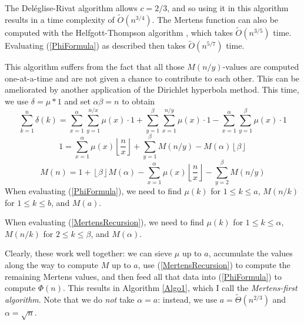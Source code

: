 \documentclass[12pt]{article}
\newcommand{\eqn}[1]{\begin{displaymath} #1 \end{displaymath}}
\newcommand{\neqn}[1]{\begin{equation} #1 \end{equation}}
\newcommand{\floor}[1]{{\left\lfloor #1 \right\rfloor}}
\newcommand{\floordiv}[2]{\floor{\frac{#1}{#2}}}
\newcommand{\softO}[0]{\widetilde{O}}
\newcommand{\softTheta}[0]{\widetilde{\Theta}}
\begin{document}
The Del\'{e}glise-Rivat algorithm \cite{DR1996} allows $c=2/3$, and so using it in this algorithm results in a time complexity of $\softO(n^{3/4})$.  The Mertens function can also be computed with the Helfgott-Thompson algorithm \cite{HT23}, which takes $\softO(n^{3/5})$ time.  Evaluating (\ref{PhiFormula}) as described then takes $\softO(n^{5/7})$ time.

This algorithm suffers from the fact that all those $M(n/y)$-values are computed one-at-a-time and are not given a chance to contribute to each other.  This can be ameliorated by another application of the Dirichlet hyperbola method.  This time, we use $\delta = \mu * 1$ and set $\alpha\beta=n$ to obtain
\eqn{\sum_{k=1}^n \delta(k) = \sum_{x=1}^{\alpha}\sum_{y=1}^{n/x} \mu(x) \cdot 1 + \sum_{y=1}^{\beta}\sum_{x=1}^{n/y} \mu(x) \cdot 1 - \sum_{x=1}^{\alpha}\sum_{y=1}^{\beta} \mu(x) \cdot 1}
\eqn{1 = \sum_{x=1}^{\alpha} \mu(x) \floordiv{n}{x} + \sum_{y=1}^{\beta} M(n/y) - M(\alpha) \floor{\beta}}
\neqn{M(n) = 1 + \floor{\beta} M(\alpha) - \sum_{x=1}^{\alpha} \mu(x) \floordiv{n}{x} - \sum_{y=2}^{\beta} M(n/y) \label{MertensRecursion}}
When evaluating (\ref{PhiFormula}), we need to find $\mu(k)$ for $1 \leq k \leq a$, $M(n/k)$ for $1 \leq k \leq b$, and $M(a)$.

When evaluating (\ref{MertensRecursion}), we need to find $\mu(k)$ for $1 \leq k \leq \alpha$, $M(n/k)$ for $2 \leq k \leq \beta$, and $M(\alpha)$.

Clearly, these work well together: we can sieve $\mu$ up to $a$, accumulate the values along the way to compute $M$ up to $a$, use (\ref{MertensRecursion}) to compute the remaining Mertens values, and then feed all that data into (\ref{PhiFormula}) to compute $\Phi(n)$.  This results in Algorithm \ref{Algo1}, which I call the \emph{Mertens-first algorithm}.  Note that we do \emph{not} take $\alpha = a$: instead, we use $a = \softTheta(n^{2/3})$ and $\alpha = \sqrt{n}$.
\end{document}

